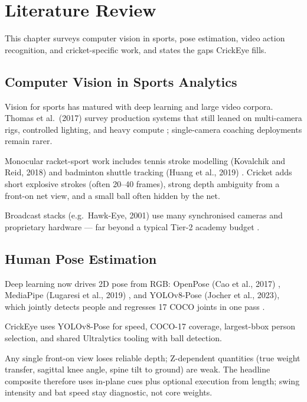 \chapter{Literature Review}
\begin{justify}

This chapter surveys computer vision in sports, pose estimation, video action recognition, and cricket-specific work, and states the gaps CrickEye fills.

\section{Computer Vision in Sports Analytics}

\par Vision for sports has matured with deep learning and large video corpora. Thomas et al.\ (2017) survey production systems that still leaned on multi-camera rigs, controlled lighting, and heavy compute \cite{Thomas2017}; single-camera coaching deployments remain rarer.

\par Monocular racket-sport work includes tennis stroke modelling (Kovalchik and Reid, 2018) and badminton shuttle tracking (Huang et al., 2019) \cite{Kovalchik2018,Huang2019}. Cricket adds short explosive strokes (often 20--40 frames), strong depth ambiguity from a front-on net view, and a small ball often hidden by the net.

\par Broadcast stacks (e.g.\ Hawk-Eye, 2001) use many synchronised cameras and proprietary hardware --- far beyond a typical Tier-2 academy budget \cite{HawkEye2001}.

\section{Human Pose Estimation}

\par Deep learning now drives 2D pose from RGB: OpenPose (Cao et al., 2017) \cite{Cao2017}, MediaPipe (Lugaresi et al., 2019) \cite{MediaPipe2019}, and YOLOv8-Pose (Jocher et al., 2023), which jointly detects people and regresses 17 COCO joints in one pass \cite{YOLOv8,Lin2014MicrosoftCOCO}.

\par CrickEye uses YOLOv8-Pose for speed, COCO-17 coverage, largest-bbox person selection, and shared Ultralytics tooling with ball detection.

\par Any single front-on view loses reliable depth; Z-dependent quantities (true weight transfer, sagittal knee angle, spine tilt to ground) are weak. The headline composite therefore uses in-plane cues plus optional execution from length; swing intensity and bat speed stay diagnostic, not core weights.


\end{justify}
